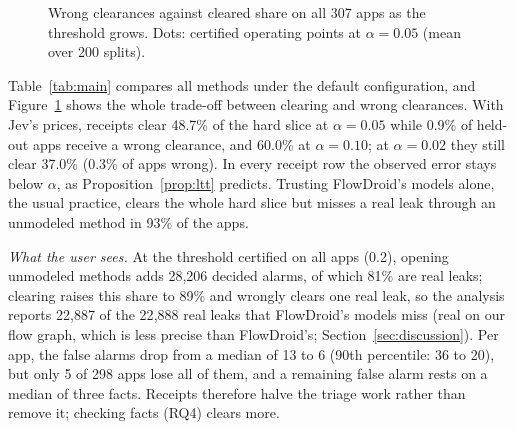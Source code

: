 \begin{figure}[t]

\caption{Wrong clearances against cleared share on all 307 apps as the threshold grows. Dots: certified operating points at $\alpha=0.05$ (mean over 200 splits).}
\label{fig:curve}
\end{figure}

Table~\ref{tab:main} compares all methods under the default configuration, and Figure~\ref{fig:curve} shows the whole trade-off between clearing and wrong clearances.
With Jev's prices, receipts clear 48.7\% of the hard slice at $\alpha=0.05$ while 0.9\% of held-out apps receive a wrong clearance, and 60.0\% at $\alpha=0.10$; at $\alpha=0.02$ they still clear 37.0\% (0.3\% of apps wrong).
In every receipt row the observed error stays below $\alpha$, as Proposition~\ref{prop:ltt} predicts.
Trusting FlowDroid's models alone, the usual practice, clears the whole hard slice but misses a real leak through an unmodeled method in 93\% of the apps.

\emph{What the user sees.}
At the threshold certified on all apps (0.2), opening unmodeled methods adds 28{,}206 decided alarms, of which 81\% are real leaks; clearing raises this share to 89\% and wrongly clears one real leak, so the analysis reports 22{,}887 of the 22{,}888 real leaks that FlowDroid's models miss (real on our flow graph, which is less precise than FlowDroid's; Section~\ref{sec:discussion}).
Per app, the false alarms drop from a median of 13 to 6 (90th percentile: 36 to 20), but only 5 of 298 apps lose all of them, and a remaining false alarm rests on a median of three facts.
Receipts therefore halve the triage work rather than remove it; checking facts (RQ4) clears more.

